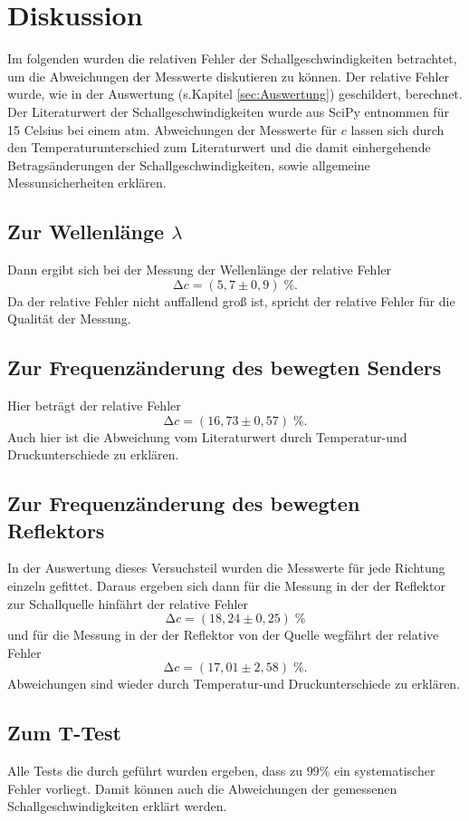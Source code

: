 \section{Diskussion}
\label{sec:Diskussion}
Im folgenden wurden die relativen Fehler der Schallgeschwindigkeiten betrachtet,
um die Abweichungen der Messwerte diskutieren zu können. Der relative Fehler wurde,
wie in der Auswertung (s.Kapitel \ref{sec:Auswertung}) geschildert, berechnet.
Der Literaturwert der
Schallgeschwindigkeiten wurde aus SciPy \cite{scipy} entnommen für 15 Celsius bei
einem atm.
Abweichungen der Messwerte für $c$ lassen sich durch
den Temperaturunterschied zum Literaturwert und die damit einhergehende
Betragsänderungen der Schallgeschwindigkeiten, sowie allgemeine Messunsicherheiten
erklären.
\subsection{Zur Wellenlänge \texorpdfstring{$\lambda$}{[math]}}
Dann ergibt sich bei der Messung der Wellenlänge der relative Fehler
\begin{equation*}
  \increment c = (5,7 \pm 0,9)\;\%.
\end{equation*}
Da der relative Fehler nicht auffallend groß ist, spricht der relative Fehler
für die Qualität der Messung.
\subsection{Zur Frequenzänderung des bewegten Senders}
Hier beträgt der relative Fehler
\begin{equation*}
    \increment c = (16,73 \pm 0,57)\;\%.
\end{equation*}
Auch hier ist die Abweichung vom Literaturwert durch Temperatur-und
Druckunterschiede zu erklären.
\subsection{Zur Frequenzänderung des bewegten Reflektors}
In der Auswertung dieses Versuchsteil wurden die Messwerte für  jede
Richtung einzeln gefittet. Daraus ergeben sich dann für die Messung in der
der Reflektor zur Schallquelle hinfährt der relative Fehler
\begin{equation*}
    \increment c = (18,24 \pm 0,25)\;\%
\end{equation*}
und für die Messung in der der Reflektor von der Quelle wegfährt der relative
Fehler
\begin{equation*}
    \increment c = (17,01 \pm 2,58)\;\%.
\end{equation*}
Abweichungen sind wieder durch Temperatur-und Druckunterschiede zu erklären.
\subsection{Zum T-Test}
Alle Tests die durch geführt wurden ergeben, dass zu $99\%$ ein systematischer
Fehler vorliegt. Damit können auch die Abweichungen der gemessenen
Schallgeschwindigkeiten erklärt werden. 
